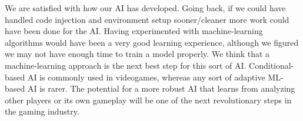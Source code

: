 \documentclass[11pt,a4paper]{article}
\begin{document}
We are satisfied with how our AI has developed. Going back, if we could have handled code injection and environment setup sooner/cleaner more work could have been done for the AI. Having experimented with machine-learning algorithms would have been a very good learning experience, although we figured we may not have enough time to train a model properly. We think that a machine-learning approach is the next best step for this sort of AI. Conditional-based AI is commonly used in videogames, whereas any sort of adaptive ML-based AI is rarer. The potential for a more robust AI that learns from analyzing other players or its own gameplay will be one of the next revolutionary steps in the gaming industry. 
\end{document}
